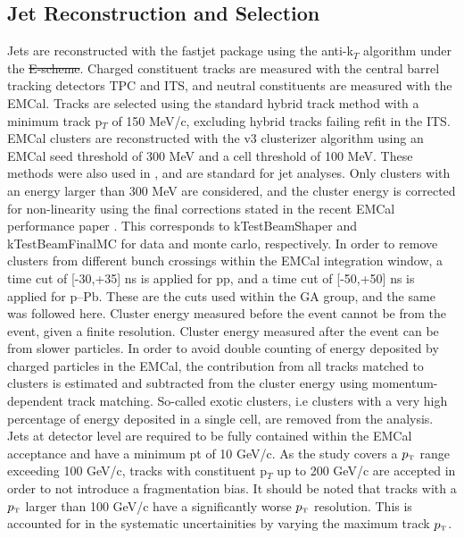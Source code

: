 \documentclass[ALICE]{ALICE_analysis_notes}
\newcommand{\pT}{$p_{\mbox{\tiny T}}$\xspace}
\newcommand{\pPb}{{\mbox{p--Pb}}\xspace}
\newcommand{\pp}{pp\xspace}
\providecommand{\DIFaddtex}[1]{{\protect\color{blue}\uwave{#1}}} %
\providecommand{\DIFdeltex}[1]{{\protect\color{red}\sout{#1}}}                      %
\providecommand{\DIFaddbegin}{} %
\providecommand{\DIFaddend}{} %
\providecommand{\DIFdelbegin}{} %
\providecommand{\DIFdelend}{} %
\providecommand{\DIFadd}[1]{\texorpdfstring{\DIFaddtex{#1}}{#1}} %
\providecommand{\DIFdel}[1]{\texorpdfstring{\DIFdeltex{#1}}{}} %
\newcommand{\DIFscaledelfig}{0.5}
\newlength{\DIFdelgraphicswidth} %
\newlength{\DIFdelgraphicsheight} %
\newcommand{\DIFaddincludegraphics}[2][]{{\color{blue}\fbox{\DIFOincludegraphics[#1]{#2}}}} %
\newcommand{\DIFdelincludegraphics}[2][]{%
\sbox{\DIFdelgraphicsbox}{\DIFOincludegraphics[#1]{#2}}%
\settoboxwidth{\DIFdelgraphicswidth}{\DIFdelgraphicsbox} %
\settoboxtotalheight{\DIFdelgraphicsheight}{\DIFdelgraphicsbox} %
\scalebox{\DIFscaledelfig}{%
\parbox[b]{\DIFdelgraphicswidth}{\usebox{\DIFdelgraphicsbox}\\[-\baselineskip] \rule{\DIFdelgraphicswidth}{0em}}\llap{\resizebox{\DIFdelgraphicswidth}{\DIFdelgraphicsheight}{%
\setlength{\unitlength}{\DIFdelgraphicswidth}%
\begin{picture}(1,1)%
\thicklines\linethickness{2pt} %
{\color[rgb]{1,0,0}\put(0,0){\framebox(1,1){}}}%
{\color[rgb]{1,0,0}\put(0,0){\line( 1,1){1}}}%
{\color[rgb]{1,0,0}\put(0,1){\line(1,-1){1}}}%
\end{picture}%
}\hspace*{3pt}}} %
} %
\DeclareRobustCommand{\DIFaddbegin}{\DIFOaddbegin \let\includegraphics\DIFaddincludegraphics} %
\DeclareRobustCommand{\DIFaddend}{\DIFOaddend \let\includegraphics\DIFOincludegraphics} %
\DeclareRobustCommand{\DIFdelbegin}{\DIFOdelbegin \let\includegraphics\DIFdelincludegraphics} %
\DeclareRobustCommand{\DIFdelend}{\DIFOaddend \let\includegraphics\DIFOincludegraphics} %
\begin{document}
\subsection{Jet Reconstruction and Selection}
\label{sec:JetRecoSel}

Jets are reconstructed with the fastjet package using the anti-k$_T$ algorithm under the \DIFdelbegin \DIFdel{E-scheme}\DIFdelend \DIFaddbegin \DIFadd{pt-scheme}\DIFaddend . Charged constituent tracks are measured with the central barrel tracking detectors TPC and ITS, and neutral constituents are measured with the EMCal. Tracks are selected using the standard hybrid track method with a minimum track p$_T$ of 150 MeV/c, excluding hybrid tracks failing refit in the ITS. EMCal clusters are reconstructed with the v3 clusterizer algorithm using an EMCal seed threshold of 300 MeV and a cell threshold of 100 MeV. These methods were also used in \cite{anaNoteMFasel}, and are standard for jet analyses. Only clusters with an energy larger than 300 MeV are considered, and the cluster energy is corrected for non-linearity using the final corrections stated in the recent EMCal performance paper \cite{EMCalPerformance2022}. This corresponds to kTestBeamShaper and kTestBeamFinalMC for data and monte carlo, respectively. In order to remove clusters from different bunch crossings within the EMCal integration window, a time cut of [-30,+35] ns is applied for \pp, and a time cut of [-50,+50] ns is applied for \pPb. These are the cuts used within the GA group, and the same was followed here. Cluster energy measured before the event cannot be from the event, given a finite resolution. Cluster energy measured after the event can be from slower particles. In order to avoid double counting of energy deposited by charged particles in the EMCal, the contribution from all tracks matched to clusters is estimated and subtracted from the cluster energy using momentum-dependent track matching. So-called exotic clusters, i.e clusters with a very high percentage of energy deposited in a single cell, are removed from the analysis. Jets at detector level are required to be fully contained within the EMCal acceptance and have a minimum pt of 10 GeV/c. As the study covers a \pT range exceeding 100 GeV/c, tracks with constituent p$_T$ up to 200 GeV/c are accepted in order to not introduce a fragmentation bias. It should be noted that tracks with a \pT larger than 100 GeV/c have a significantly worse \pT resolution. This is accounted for in the systematic uncertainities by varying the maximum track \pT.
\end{document}
